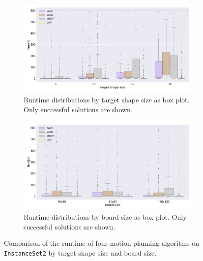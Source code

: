 \begin{figure}[htpb]
\centering
\begin{subfigure}[b]{\textwidth}
\centering
\includegraphics[width=\textwidth]{figures/plots/heuristic_solvers_i2/i2_time_over_target_size.pdf}
\caption{Runtime distributions by target shape size as box plot. Only successful solutions are shown.}
\label{fig:i2_time_over_target_size}
\end{subfigure}
\begin{subfigure}[b]{\textwidth}
\centering
\includegraphics[width=\textwidth]{figures/plots/heuristic_solvers_i2/i2_time_over_board_size.pdf}
\caption{Runtime distributions by board size as box plot. Only successful solutions are shown.}
\label{fig:i2_time_over_board_size}
\end{subfigure}
\caption[Runtime of several motion planners on \texttt{InstanceSet2}]{Comparison of the runtime of four motion planning algoritms on \texttt{InstanceSet2} by target shape size and board size.}
\label{fig:i2_performance1}
\end{figure}
